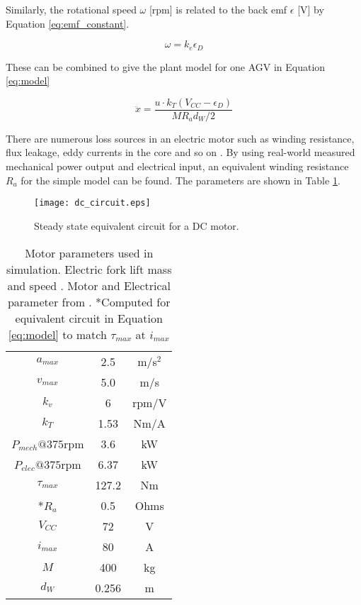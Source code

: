 Similarly, the rotational speed $\omega$ [rpm] is related to the back emf $\epsilon$ [V] by Equation \ref{eq:emf_constant}.

\begin{equation}
	\omega = {k_e}\epsilon_D 
	\label{eq:emf_constant}
\end{equation}

These can be combined to give the plant model for one AGV in Equation \ref{eq:model}

\begin{equation}
	\ddot{x} =\frac{ u \cdot k_T (V_{CC} - \epsilon_D) }{M R_a d_W/2}
	\label{eq:model}
\end{equation}

There are numerous loss sources in an electric motor such as winding resistance, flux leakage, eddy currents in the core and so on \cite{Sarlioglu2016}. By using real-world measured mechanical power output and electrical input, an equivalent winding resistance $R_a$ for the simple model can be found. The parameters are shown in Table \ref{tab:motor_params}.

\begin{figure}[ht]
	\centering
	\texttt{[image: dc\_circuit.eps]}
	\caption{Steady state equivalent circuit for a DC motor.}
	\label{fig:dc_circuit}
\end{figure}


\begin{table}
	\caption{Motor parameters used in simulation. Electric fork lift mass and speed \cite{Hyster2020a}. Motor and Electrical parameter from \cite{Racewicz2018}. *Computed for equivalent circuit in Equation \ref{eq:model} to match $\tau_{max}$ at $i_{max}$ }
	\label{tab:motor_params} 
	\centering
	\begin{tabular}{ |c|c|c| }
		\hline
		$a_{max}$ & 2.5 & m/s$^2$\\
		$v_{max}$ & 5.0& m/s \\
		$k_v$ & 6 & rpm/V\\ 
		$k_T$ & 1.53 & Nm/A\\ 
		$P_{mech}@375$rpm & 3.6 & kW\\ 
		$P_{elec}@375$rpm & 6.37 & kW \\
		$\tau_{max}$ & 127.2 & Nm\\
		*$R_a$ & 0.5 & Ohms\\
		$V_{CC}$ & 72 & V\\
		$i_{max}$ & 80 & A\\
		$M$ & 400 & kg\\
		$d_W$ & 0.256 & m\\
		\hline
	\end{tabular}
\end{table}

